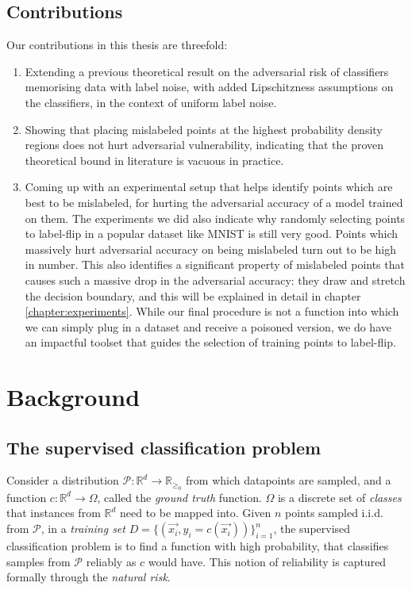 \documentclass{ociamthesis}
\begin{document}
\section{Contributions}
Our contributions in this thesis are threefold:
\begin{enumerate}
    \item Extending a previous theoretical result on the adversarial risk of
    classifiers memorising data with label noise, with added Lipschitzness
    assumptions on the classifiers, in the context of uniform label noise.
    \item Showing that placing mislabeled points at the highest probability
    density regions does not hurt adversarial vulnerability, indicating that the
    proven theoretical bound in literature is vacuous in practice.
    \item Coming up with an experimental setup that helps identify points which
    are best to be mislabeled, for hurting the adversarial accuracy of a model
    trained on them. The experiments we did also indicate why randomly selecting
    points to label-flip in a popular dataset like MNIST is still very good.
    Points which massively hurt adversarial accuracy on being mislabeled turn
    out to be high in number. This also identifies a significant property of
    mislabeled points that causes such a massive drop in the adversarial
    accuracy: they draw and stretch the decision boundary, and this will be
    explained in detail in chapter \ref{chapter:experiments}. While our final
    procedure is not a function into which we can simply plug in a dataset and
    receive a poisoned version, we do have an impactful toolset that guides the
    selection of training points to label-flip.
\end{enumerate}


\chapter{Background}
\section{The supervised classification problem}

Consider a distribution $\mathcal{P}: \mathbb{R}^d \to \mathbb{R}_{\geq_0}$ from
which datapoints are sampled, and a function $c: \mathbb{R}^d \to \Omega$,
called the \emph{ground truth} function. $\Omega$ is a discrete set of
\emph{classes} that instances from $\mathbb{R}^d$ need to be mapped into. Given
$n$ points sampled i.i.d. from $\mathcal{P}$, in a \emph{training set}
$D=\{(\vec{x_i}, y_i=c(\vec{x_i}))\}_{i=1}^{n}$, the supervised classification
problem is to find a function with high probability, that classifies samples
from $\mathcal{P}$ reliably as $c$ would have. This notion of reliability is
captured formally through the \emph{natural risk}.
\end{document}
